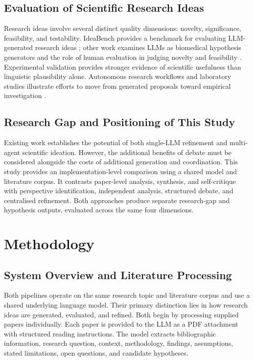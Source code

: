\documentclass[sigconf,review,anonymous=false]{acmart}
\begin{document}
\subsection{Evaluation of Scientific Research Ideas}
Research ideas involve several distinct quality dimensions: novelty, significance, feasibility, and testability. IdeaBench provides a benchmark for evaluating LLM-generated research ideas \cite{guo2025ideabench}; other work examines LLMs as biomedical hypothesis generators and the role of human evaluation in judging novelty and feasibility \cite{qi2024biomedical,si2025novel}. Experimental validation provides stronger evidence of scientific usefulness than linguistic plausibility alone. Autonomous research workflows and laboratory studies illustrate efforts to move from generated proposals toward empirical investigation \cite{boiko2023autonomous,scientific2025laboratory}.

\subsection{Research Gap and Positioning of This Study}
Existing work establishes the potential of both single-LLM refinement and multi-agent scientific ideation. However, the additional benefits of debate must be considered alongside the costs of additional generation and coordination. This study provides an implementation-level comparison using a shared model and literature corpus. It contrasts paper-level analysis, synthesis, and self-critique with perspective identification, independent analysis, structured debate, and centralised refinement. Both approaches produce separate research-gap and hypothesis outputs, evaluated across the same four dimensions.

\section{Methodology}
\subsection{System Overview and Literature Processing}
Both pipelines operate on the same research topic and literature corpus and use a shared underlying language model. Their primary distinction lies in how research ideas are generated, evaluated, and refined. Both begin by processing supplied papers individually. Each paper is provided to the LLM as a PDF attachment with structured reading instructions. The model extracts bibliographic information, research question, context, methodology, findings, assumptions, stated limitations, open questions, and candidate hypotheses.
\end{document}
